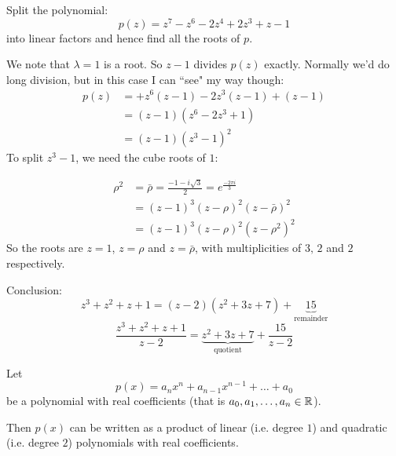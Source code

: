 \documentclass[twoside]{scrartcl}
\begin{document}
\begin{example}
Split the polynomial: 
\[p(z) = z^7 - z^6 - 2z^4 + 2z^3 + z -1\]	
into linear factors and hence find all the roots of $p$. 

We note that $\lambda = 1$ is a root. So $z -1$ divides $p(z)$ exactly. Normally we'd do long division, but in this case I can ``see" my way though: 
\[
\begin{aligned}
  p(z)&= +z^6(z-1) - 2z^3(z-1) + (z-1)\\
  &= (z-1)(z^6 -2z^3 + 1)\\
  &= (z-1)(z^3-1)^2
\end{aligned}
\]
To split $z^3 -1$, we need the cube roots of $1$: 

\begin{center}
\end{center}
\[
\begin{aligned}
  \rho^2 &= \bar{\rho} = \frac{-1-i\sqrt{3}}{2} = e^{\frac{-2\pi i}{3}}\\
  &= (z-1)^3(z-\rho)^2(z-\bar{\rho})^2\\
  &= (z-1)^3(z-\rho)^2(z-\rho^2)^2
\end{aligned}
\]
So the roots are $z = 1$, $z = \rho$ and $z = \bar{\rho}$, with multiplicities of $3,\,2$ and $2$ respectively. 
\end{example}\vspace*{5pt}

\begin{example}
\vspace*{5pt}

	
Conclusion: 
\[z^3 + z^2 +  z + 1 = (z-2)(z^2 + 3z + 7) + \underbrace{15}_{\text{remainder}}\]
\[\frac{z^3 + z^2 + z + 1}{z-2} = \underbrace{z^2 + 3z + 7}_{\text{quotient}} + \frac{15}{z-2}\]
\end{example}

\begin{corollary}
Let 
\[p(x) = a_nx^n + a_{n-1}x^{n-1} + \dots + a_0\]
be a polynomial with real coefficients (that is $a_0,a_1,\dots,a_n \in\mathbb{R}$). 

Then $p(x)$ can be written as a product of linear (i.e. degree $1$) and quadratic (i.e. degree $2$) polynomials with real coefficients. 
\end{corollary}
\end{document}
